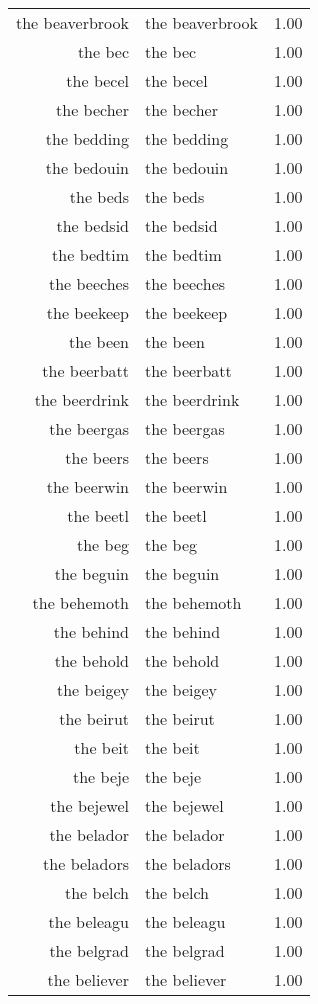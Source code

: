 \begin{table}[ht]
\begin{tabular}{rlr}
  the beaverbrook & the beaverbrook & 1.00 \\ 
  the bec & the bec & 1.00 \\ 
  the becel & the becel & 1.00 \\ 
  the becher & the becher & 1.00 \\ 
  the bedding & the bedding & 1.00 \\ 
  the bedouin & the bedouin & 1.00 \\ 
  the beds & the beds & 1.00 \\ 
  the bedsid & the bedsid & 1.00 \\ 
  the bedtim & the bedtim & 1.00 \\ 
  the beeches & the beeches & 1.00 \\ 
  the beekeep & the beekeep & 1.00 \\ 
  the been & the been & 1.00 \\ 
  the beerbatt & the beerbatt & 1.00 \\ 
  the beerdrink & the beerdrink & 1.00 \\ 
  the beergas & the beergas & 1.00 \\ 
  the beers & the beers & 1.00 \\ 
  the beerwin & the beerwin & 1.00 \\ 
  the beetl & the beetl & 1.00 \\ 
  the beg & the beg & 1.00 \\ 
  the beguin & the beguin & 1.00 \\ 
  the behemoth & the behemoth & 1.00 \\ 
  the behind & the behind & 1.00 \\ 
  the behold & the behold & 1.00 \\ 
  the beigey & the beigey & 1.00 \\ 
  the beirut & the beirut & 1.00 \\ 
  the beit & the beit & 1.00 \\ 
  the beje & the beje & 1.00 \\ 
  the bejewel & the bejewel & 1.00 \\ 
  the belador & the belador & 1.00 \\ 
  the beladors & the beladors & 1.00 \\ 
  the belch & the belch & 1.00 \\ 
  the beleagu & the beleagu & 1.00 \\ 
  the belgrad & the belgrad & 1.00 \\ 
  the believer & the believer & 1.00 \\ 

\end{tabular}
\end{table}
